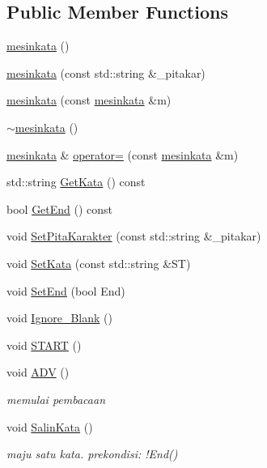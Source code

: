 \subsection*{Public Member Functions}
\begin{DoxyCompactItemize}
\item 
\hyperlink{classmesinkata_a0ecf4ed898251dd6a05e11744090881e}{mesinkata} ()
\item 
\hyperlink{classmesinkata_a7cedc728dcc5bf339066dd2aae1c9f58}{mesinkata} (const std\-::string \&\-\_\-pitakar)
\item 
\hyperlink{classmesinkata_a0d221316d72f1bdfcdf4bd8eb11a5d91}{mesinkata} (const \hyperlink{classmesinkata}{mesinkata} \&m)
\item 
\hyperlink{classmesinkata_ad37a3e30b664e6092c0273c66148bf7d}{$\sim$mesinkata} ()
\item 
\hyperlink{classmesinkata}{mesinkata} \& \hyperlink{classmesinkata_a7bcafd23d907196725a133342ca7c99d}{operator=} (const \hyperlink{classmesinkata}{mesinkata} \&m)
\item 
std\-::string \hyperlink{classmesinkata_aa87c5d5fd7f0c45cce2244e3d80492e9}{Get\-Kata} () const 
\item 
bool \hyperlink{classmesinkata_a608feb73de0532ebcd4f3a079054b87d}{Get\-End} () const 
\item 
void \hyperlink{classmesinkata_ac09172015c4a048cb429198988a95472}{Set\-Pita\-Karakter} (const std\-::string \&\-\_\-pitakar)
\item 
void \hyperlink{classmesinkata_ab0628c8aa28428f280ddddc3fbbb5625}{Set\-Kata} (const std\-::string \&S\-T)
\item 
void \hyperlink{classmesinkata_ade4e0c75e5844ea47e8530a2b8ecacb9}{Set\-End} (bool End)
\item 
void \hyperlink{classmesinkata_a016945f311dfbb8c049dd5f9f6b0c852}{Ignore\-\_\-\-Blank} ()
\item 
void \hyperlink{classmesinkata_a9ce4e2f76886ae5674bdd02c395ad9c4}{S\-T\-A\-R\-T} ()
\item 
void \hyperlink{classmesinkata_aa9d334f1b013d6e2f23f791346561e76}{A\-D\-V} ()
\begin{DoxyCompactList}\small\item\em memulai pembacaan \end{DoxyCompactList}\item 
void \hyperlink{classmesinkata_a59ea3cc863b68a69bd728715242fef55}{Salin\-Kata} ()
\begin{DoxyCompactList}\small\item\em maju satu kata. prekondisi\-: !\-End() \end{DoxyCompactList}\item 

\end{DoxyCompactItemize}
